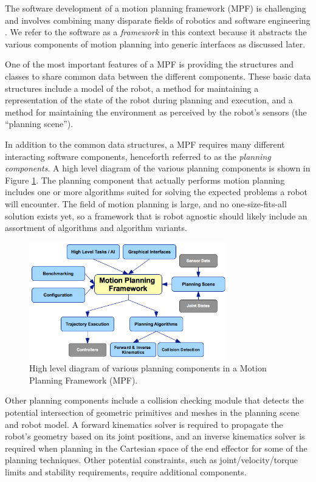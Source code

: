 \documentclass[10pt,journal,compsoc]{joser1}
\begin{document}
{The software development of a motion planning framework (MPF) is challenging and involves combining many disparate fields of robotics and software engineering \cite{perez2010roadmap}. We refer to the software as a \textit{framework} in this context because it abstracts the various components of motion planning into generic interfaces as discussed later.

One of the most important features of a MPF is providing the structures and classes to share common data between the different components. These basic data structures include a model of the robot, a method for maintaining a representation of the state of the robot during planning and execution, and a method for maintaining the environment as perceived by the robot's sensors (the ``planning scene'').

In addition to the common data structures, a MPF requires many different interacting software components, henceforth referred to as the \textit{planning components}. A high level diagram of the various planning components is shown in Figure \ref{fig:motionplanning_highlevel}. The planning component that actually performs motion planning includes one or more algorithms suited for solving the expected problems a robot will encounter. The field of motion planning is large, and no one-size-fits-all solution exists yet, so a framework that is robot agnostic should likely include an assortment of algorithms and algorithm variants.

\begin{figure}[!t]
\centering
\includegraphics[width=3.4in]{images/motionplanning_highlevel}
\caption{High level diagram of various planning components in a Motion Planning Framework (MPF).}
\label{fig:motionplanning_highlevel}
\end{figure} 

Other planning components include a collision checking module that detects the potential intersection of geometric primitives and meshes in the planning scene and robot model. A forward kinematics solver is required to propagate the robot's geometry based on its joint positions, and an inverse kinematics solver is required when planning in the Cartesian space of the end effector for some of the planning techniques. Other potential constraints, such as joint/velocity/torque limits and stability requirements, require additional components.

}
\end{document}
